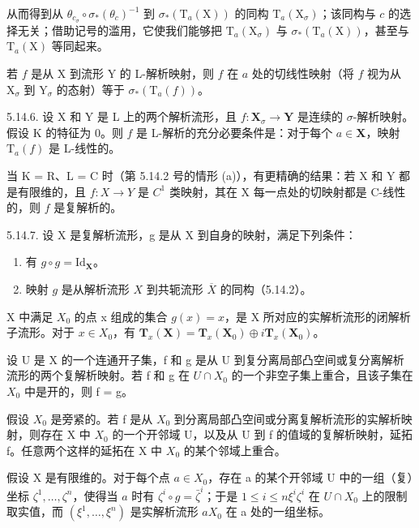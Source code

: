 从而得到从 \(\theta_{c_{\sigma}} \circ \sigma_{*}(\theta_{c})^{-1}\) 到 \(\sigma_{*}(\mathrm{T}_{a}(\mathrm{X}))\) 的同构 \(\mathrm{T}_{a}(\mathrm{X}_{\sigma})\)；该同构与 \(c\) 的选择无关；借助记号的滥用，它使我们能够把 \(\mathrm{T}_{a}(\mathrm{X}_{\sigma})\) 与 \(\sigma_{*}(\mathrm{T}_{a}(\mathrm{X}))\)，甚至与 \(\mathrm{T}_{a}(\mathrm{X})\) 等同起来。

若 \(f\) 是从 X 到流形 Y 的 L-解析映射，则 \(f\) 在 \(a\) 处的切线性映射（将 \(f\) 视为从 \(\mathrm{X}_{\sigma}\) 到 \(\mathrm{Y}_{\sigma}\) 的态射）等于 \(\sigma_{*}(\mathrm{T}_{a}(f))\)。

5.14.6. 设 X 和 Y 是 L 上的两个解析流形，且 \(f: \mathbf{X}_{\sigma} \to \mathbf{Y}\) 是连续的 \(\sigma\)-解析映射。假设 K 的特征为 0。则 \(f\) 是 L-解析的充分必要条件是：对于每个 \(a \in \mathbf{X}\)，映射 \(\mathrm{T}_{a}(f)\) 是 L-线性的。

当 K = R、L = C 时（第 5.14.2 号的情形 (a)），有更精确的结果：若 X 和 Y 都是有限维的，且 \(f: X \to Y\) 是 \(C^{1}\) 类映射，其在 X 每一点处的切映射都是 C-线性的，则 \(f\) 是复解析的。

5.14.7. 设 X 是复解析流形，g 是从 X 到自身的映射，满足下列条件：

\begin{enumerate}
\def\labelenumi{(\roman{enumi})}
\item
  有 \(g \circ g = \mathrm{Id}_{\mathbf{X}}\)。
\item
  映射 \(g\) 是从解析流形 \(X\) 到共轭流形 \(\overline{X}\) 的同构（5.14.2）。
\end{enumerate}

X 中满足 \(X_{0}\) 的点 x 组成的集合 \(g(x) = x\)，是 X 所对应的实解析流形的闭解析子流形。对于 \(x \in X_{0}\)，有 \(\mathbf{T}_{x}(\mathbf{X}) = \mathbf{T}_{x}(\mathbf{X}_{0}) \oplus i\mathbf{T}_{x}(\mathbf{X}_{0})\)。

设 U 是 X 的一个连通开子集，f 和 g 是从 U 到复分离局部凸空间或复分离解析流形的两个复解析映射。若 f 和 g 在 \(U \cap X_{0}\) 的一个非空子集上重合，且该子集在 \(X_{0}\) 中是开的，则 f = g。

假设 \(X_{0}\) 是旁紧的。若 f 是从 \(X_{0}\) 到分离局部凸空间或分离复解析流形的实解析映射，则存在 X 中 \(X_{0}\) 的一个开邻域 U，以及从 U 到 f 的值域的复解析映射，延拓 f。任意两个这样的延拓在 X 中 \(X_{0}\) 的某个邻域上重合。

假设 X 是有限维的。对于每个点 \(a \in X_{0}\)，存在 a 的某个开邻域 U 中的一组（复）坐标 \(\zeta^{1}, \ldots, \zeta^{n}\)，使得当 \(a\) 时有 \(\zeta^{i} \circ g = \bar{\zeta}^{i}\)；于是 \(1 \leqslant i \leqslant n\)\(\xi^{i}\)\(\zeta^{i}\) 在 \(U \cap X_{0}\) 上的限制  取实值，而 \((\xi^{1}, \ldots, \xi^{n})\) 是实解析流形 \(a\)\(X_{0}\) 在 a 处的一组坐标。

